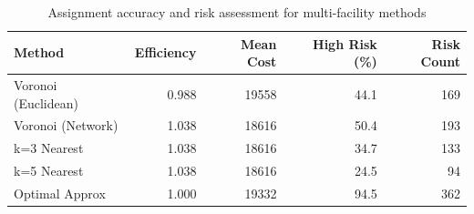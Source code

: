 \begin{table}
\caption{Assignment accuracy and risk assessment for multi-facility methods}
\label{tab:multifacility_accuracy}
\begin{tabular}{lrrrr}
\toprule
Method & Efficiency & Mean Cost & High Risk (\%) & Risk Count \\
\midrule
Voronoi (Euclidean) & 0.988 & 19558 & 44.1 & 169 \\
Voronoi (Network) & 1.038 & 18616 & 50.4 & 193 \\
k=3 Nearest & 1.038 & 18616 & 34.7 & 133 \\
k=5 Nearest & 1.038 & 18616 & 24.5 & 94 \\
Optimal Approx & 1.000 & 19332 & 94.5 & 362 \\
\bottomrule
\end{tabular}
\end{table}